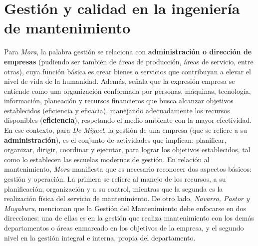 \documentclass[
	12pt, %
	fleqn, %
	a4paper, %
	oneside, %
]{LegrandOrangeBook}
\begin{document}
\section{Gestión y calidad en la ingeniería de mantenimiento}
Para \textit{Mora}, la palabra gestión se relaciona con \textbf{administración o dirección de empresas} (pudiendo ser también de áreas de producción, áreas de servicio, entre otras), cuya función básica es crear bienes o servicios que contribuyan a elevar el nivel de vida de la humanidad. Además, señala que la expresión empresa se entiende como una organización conformada por personas, máquinas, tecnología, información, planeación y recursos financieros que busca alcanzar objetivos establecidos (eficiencia y eficacia), manejando adecuadamente los recursos disponibles (\textbf{eficiencia}), respetando el medio ambiente con la mayor efectividad. En ese contexto, para \textit{De Miguel}, la gestión de una empresa (que se refiere a su \textbf{administración}), es el conjunto de actividades que implican: planificar, organizar, dirigir, coordinar y ejecutar, para lograr los objetivos establecidos, tal como lo establecen las escuelas modernas de gestión. En relación al mantenimiento, \textit{Mora} manifiesta que es necesario reconocer dos aspectos básicos: gestión y operación. La primera se refiere al manejo de los recursos, a su planificación, organización y a su control, mientras que la segunda es la realización física del servicio de mantenimiento. De otro lado, \textit{Navarro, Pastor y Mugaburu}, mencionan que la Gestión del Mantenimiento debe enfocarse en dos direcciones: una de ellas es en la gestión que realiza mantenimiento con los demás departamentos o áreas enmarcado en los objetivos de la empresa, y el segundo nivel en la gestión integral e interna, propia del departamento.
\end{document}
